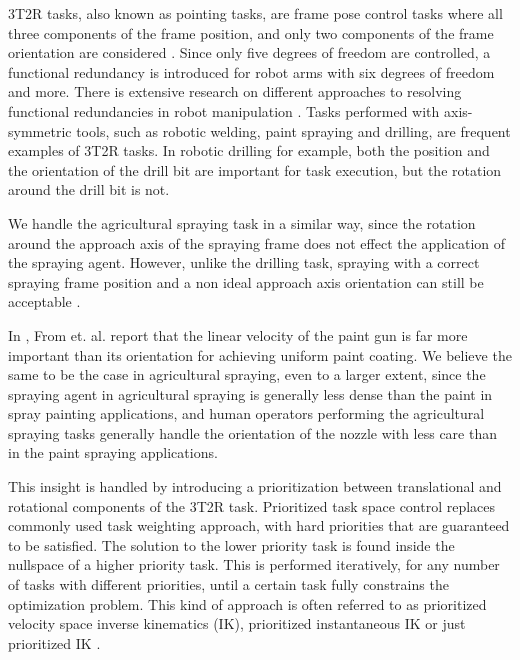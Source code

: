 3T2R tasks, also known as pointing tasks, are frame pose control tasks where all three components of the frame position, and only two components of the frame orientation are considered \cite{Schappler2019}. Since only five degrees of freedom are controlled, a functional redundancy is introduced for robot arms with six degrees of freedom and more. There is extensive research on different approaches to resolving functional redundancies in robot manipulation \cite{From2007, Zlajpah2017, Schappler2019, Zlajpah2021, Zanchettin2011}. 
Tasks performed with axis-symmetric tools, such as robotic welding, paint spraying and drilling, are frequent examples of 3T2R tasks. In robotic drilling for example, both the position and the orientation of the drill bit are important for task execution, but the rotation around the drill bit is not. 

We handle the agricultural spraying task in a similar way, since the rotation around the approach axis of the spraying frame does not effect the application of the spraying agent. However, unlike the drilling task, spraying with a correct spraying frame position and a non ideal approach axis orientation can still be acceptable \cite{From2010, From2011, Zanchettin2011}. 

In \cite{From2011}, From et. al. report that the linear velocity of the paint gun is far more important than its orientation for achieving uniform paint coating. We believe the same to be the case in agricultural spraying, even to a larger extent, since the spraying agent in agricultural spraying is generally less dense than the paint in spray painting applications, and human operators performing the agricultural spraying tasks generally handle the orientation of the nozzle with less care than in the paint spraying applications. 

This insight is handled by introducing a prioritization between translational and rotational components of the 3T2R task. 
Prioritized task space control \cite{deLasa2009, deLasa2010, Wensing2013} replaces commonly used task weighting approach, with hard priorities that are guaranteed to be satisfied. The solution to the lower priority task is found inside the nullspace of a higher priority task. This is performed iteratively, for any number of tasks with different priorities, until a certain task fully constrains the optimization problem. This kind of approach is often referred to as prioritized velocity space inverse kinematics (IK), prioritized instantaneous IK or just prioritized IK \cite{Chiacchio1991, Lillo2019, Moe2016, An2019}. 

